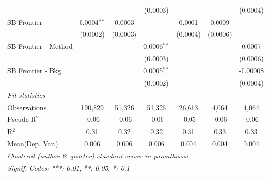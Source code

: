 \begin{tabular}{lcccccc}
                        &               &          & (0.0003)       &          &             & (0.0004)\\   
   SB Frontier          & 0.0004$^{**}$ & 0.0003   &                & 0.0001   & 0.0009      &   \\   
                        & (0.0002)      & (0.0003) &                & (0.0004) & (0.0006)    &   \\   
   SB Frontier - Method &               &          & 0.0006$^{**}$  &          &             & 0.0007\\   
                        &               &          & (0.0003)       &          &             & (0.0006)\\   
   SB Frontier - Bkg.   &               &          & 0.0005$^{**}$  &          &             & -0.00008\\   
                        &               &          & (0.0002)       &          &             & (0.0004)\\   
   \midrule
   \emph{Fit statistics}\\
   Observations         & 190,829       & 51,326   & 51,326         & 26,613   & 4,064       & 4,064\\  
   Pseudo R$^2$         & -0.06         & -0.06    & -0.06          & -0.05    & -0.06       & -0.06\\  
   R$^2$                & 0.31          & 0.32     & 0.32           & 0.31     & 0.33        & 0.33\\  
Mean(Dep. Var.) & 0.006 & 0.006 & 0.006 & 0.004 & 0.004 & 0.004 \\
   \midrule \midrule
   \multicolumn{7}{l}{\emph{Clustered (author \& quarter) standard-errors in parentheses}}\\
   \multicolumn{7}{l}{\emph{Signif. Codes: ***: 0.01, **: 0.05, *: 0.1}}\\
\end{tabular}
\par\endgroup
